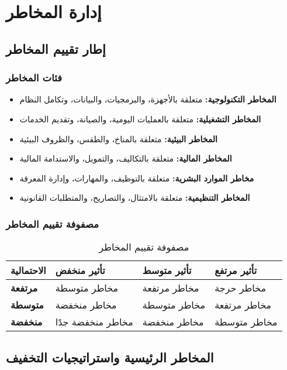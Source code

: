 \section{إدارة المخاطر}

\subsection{إطار تقييم المخاطر}

\subsubsection{فئات المخاطر}
\begin{itemize}
    \item \textbf{المخاطر التكنولوجية:} متعلقة بالأجهزة، والبرمجيات، والبيانات، وتكامل النظام
    \item \textbf{المخاطر التشغيلية:} متعلقة بالعمليات اليومية، والصيانة، وتقديم الخدمات
    \item \textbf{المخاطر البيئية:} متعلقة بالمناخ، والطقس، والظروف البيئية
    \item \textbf{المخاطر المالية:} متعلقة بالتكاليف، والتمويل، والاستدامة المالية
    \item \textbf{مخاطر الموارد البشرية:} متعلقة بالتوظيف، والمهارات، وإدارة المعرفة
    \item \textbf{المخاطر التنظيمية:} متعلقة بالامتثال، والتصاريح، والمتطلبات القانونية
\end{itemize}

\subsubsection{مصفوفة تقييم المخاطر}
\begin{table}[H]
\centering
\begin{tabular}{|l|l|l|l|}
\hline
\textbf{الاحتمالية} & \textbf{تأثير منخفض} & \textbf{تأثير متوسط} & \textbf{تأثير مرتفع} \\
\hline
\textbf{مرتفعة} & مخاطر متوسطة & مخاطر مرتفعة & مخاطر حرجة \\
\hline
\textbf{متوسطة} & مخاطر منخفضة & مخاطر متوسطة & مخاطر مرتفعة \\
\hline
\textbf{منخفضة} & مخاطر منخفضة جدًا & مخاطر منخفضة & مخاطر متوسطة \\
\hline
\end{tabular}
\caption{مصفوفة تقييم المخاطر}
\end{table}

\subsection{المخاطر الرئيسية واستراتيجيات التخفيف}

